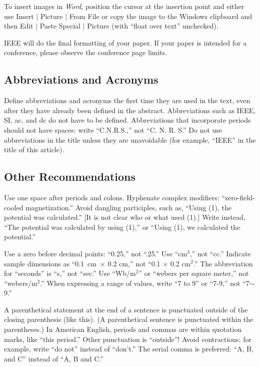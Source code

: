 \documentclass[journal]{IEEEtai}
\begin{document}
To insert images in {\it Word}, position the cursor at the insertion point and either use Insert $|$ Picture $|$ From File or copy the image to the Windows clipboard and then Edit $|$ Paste Special $|$ Picture (with ``float over text'' unchecked). 

IEEE will do the final formatting of your paper. If your paper is intended for a conference, please observe the conference page limits.

\subsection{Abbreviations and Acronyms}

Define abbreviations and acronyms the first time they are used in the text, even after they have already been defined in the abstract. Abbreviations such as IEEE, SI, ac, and dc do not have to be defined. Abbreviations that incorporate periods should not have spaces: write ``C.N.R.S.,'' not ``C. N. R. S.'' Do not use abbreviations in the title unless they are unavoidable (for example, ``IEEE'' in the title of this article).

\subsection{Other Recommendations}

Use one space after periods and colons. Hyphenate complex modifiers: ``zero-field-cooled magnetization.'' Avoid dangling participles, such as, ``Using (1), the potential was calculated.'' [It is not clear who or what used (1).] Write instead, ``The potential was calculated by using (1),'' or ``Using (1), we calculated the potential.''

Use a zero before decimal points: ``0.25,'' not ``.25.'' Use ``cm$^3$,'' not ``cc.'' Indicate sample dimensions as ``0.1~cm~$\times$ 0.2 cm,'' not ``0.1 $\times$ 0.2 cm$^2$.'' The abbreviation for ``seconds'' is ``s,'' not ``sec.'' Use ``Wb/m$^2$'' or ``webers per square meter,'' not ``webers/m$^2$.'' When expressing a range of values, write ``7 to 9'' or ``7-9,'' not ``7$\sim$9.''

A parenthetical statement at the end of a sentence is punctuated outside of the closing parenthesis (like this). (A parenthetical sentence is punctuated within the parentheses.) In American English, periods and commas are within quotation marks, like ``this period.'' Other punctuation is ``outside''$!$ Avoid contractions; for example, write ``do not'' instead of ``don't.'' The serial comma is preferred: ``A, B, and C'' instead of ``A, B and C.''
\end{document}
